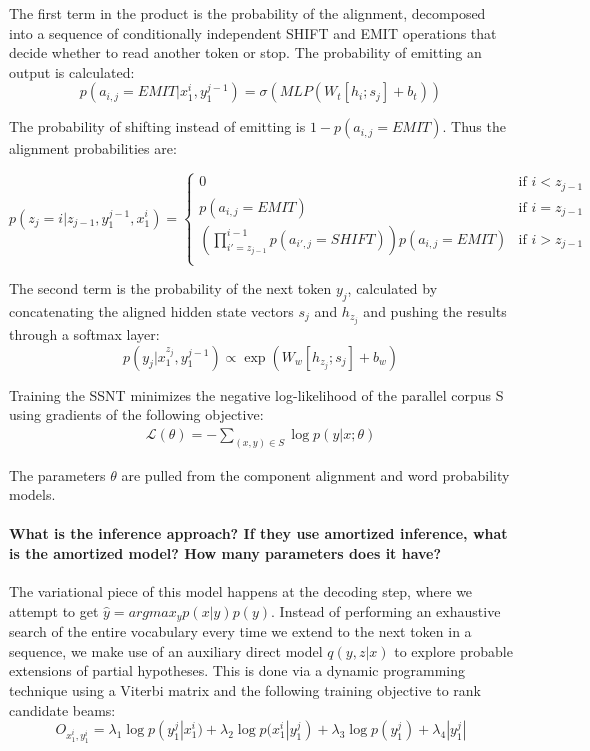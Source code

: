 \documentclass[11pt]{article}
\begin{document}
The first term in the product is the probability of the alignment, decomposed into a sequence of conditionally independent SHIFT and EMIT operations that decide whether to read another token or stop. The probability of emitting an output is calculated:
$$p(a_{i,j} = EMIT | x_1^{i},y_1^{j-1}) = \sigma(MLP(W_t[h_i;s_j] + b_t))$$

The probability of shifting instead of emitting is $1 - p(a_{i,j} = EMIT)$. Thus the alignment probabilities are:

$$p(z_j=i|z_{j-1},y_1^{j-1},x_1^i) = 
\begin{cases}
  0 & \text{if $i < z_{j-1}$} \\
  p(a_{i,j} = EMIT) & \text{if $i=z_{j-1}$} \\ 
  (\prod_{i'=z_{j-1}}^{i-1}p(a_{i',j}=SHIFT))p(a_{i,j} = EMIT) & \text{if $i>z_{j-1}$} \\ 
\end{cases}
$$

The second term is the probability of the next token $y_j$, calculated by concatenating the aligned hidden state vectors $s_j$ and $h_{z_j}$ and pushing the results through a softmax layer:
$$p(y_j|x_1^{z_j},y_1^{j-1}) \propto \exp(W_w[h_{z_j};s_j] + b_w)$$

Training the SSNT minimizes the negative log-likelihood of the parallel corpus S using gradients of the following objective:
\begin{align*}
  \mathcal{L}(\theta) = -\sum_{(x,y)\in S} \log p(y|x;\theta)
\end{align*}

The parameters $\theta$ are pulled from the component alignment and word probability models.

\paragraph{What is the inference approach? If they use amortized inference, what is the amortized model? How many parameters does it have?} The variational piece of this model happens at the decoding step, where we attempt to get $\hat{y}=argmax_y p(x|y)p(y)$. Instead of performing an exhaustive search of the entire vocabulary every time we extend to the next token in a sequence, we make use of an auxiliary direct model $q(y,z|x)$ to explore probable extensions of partial hypotheses. This is done via a dynamic programming technique using a Viterbi matrix and the following training objective to rank candidate beams:
$$O_{x_1^i,y_1^i} = \lambda_1 \log p(y_1^j|x_1^i) + \lambda_2 \log p(x_1^i|y_1^j) + \lambda_3 \log p(y_1^j) + \lambda_4 |y_1^j| $$
\end{document}
